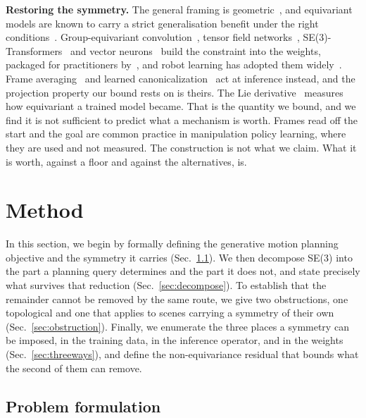 \documentclass[10pt,twocolumn,letterpaper]{article}
\begin{document}
\textbf{Restoring the symmetry.} The general framing is
geometric~\cite{bronstein2021gdl}, and equivariant models are known to carry a
strict generalisation benefit under the right conditions~\cite{elesedy2021strict}.
Group-equivariant
convolution~\cite{cohen2016gcnn}, tensor field networks~\cite{thomas2018tfn},
SE(3)-Transformers~\cite{fuchs2020se3t} and vector neurons~\cite{deng2021vn}
build the constraint into the weights, packaged for practitioners
by~\cite{geiger2022e3nn}, and robot learning has adopted them
widely~\cite{ryu2023edf,simeonov2022ndf,urain2023se3dif,wang2024equidp,yang2024equibot}.
Frame averaging~\cite{puny2022fa} and learned
canonicalization~\cite{kaba2023canon} act at inference instead, and the
projection property our bound rests on is theirs. The Lie
derivative~\cite{gruver2023lie} measures how equivariant a trained model became.
That is the quantity we bound, and we find it is not sufficient to predict what
a mechanism is worth. Frames read off the start and the goal are common practice in
manipulation policy learning, where they are used and not measured. The
construction is not what we claim. What it is worth, against a floor and against
the alternatives, is.

\section{Method}
In this section, we begin by formally defining the generative motion planning objective and the symmetry it carries (Sec.~\ref{sec:problem}). We then decompose SE(3) into the part a planning query determines and the part it does not, and state precisely what survives that reduction (Sec.~\ref{sec:decompose}). To establish that the remainder cannot be removed by the same route, we give two obstructions, one topological and one that applies to scenes carrying a symmetry of their own (Sec.~\ref{sec:obstruction}). Finally, we enumerate the three places a symmetry can be imposed, in the training data, in the inference operator, and in the weights (Sec.~\ref{sec:threeways}), and define the non-equivariance residual that bounds what the second of them can remove.



\subsection{Problem formulation}
\label{sec:problem}
\end{document}
